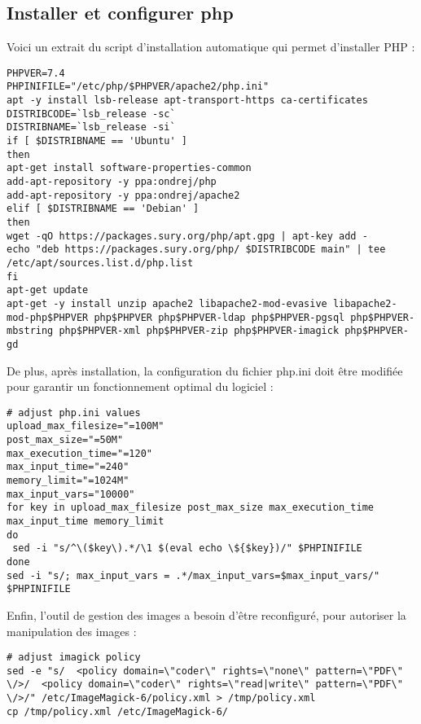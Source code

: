 \subsection{Installer et configurer php}
Voici un extrait du script d'installation automatique qui permet d'installer PHP :
\begin{lstlisting}
PHPVER=7.4
PHPINIFILE="/etc/php/$PHPVER/apache2/php.ini"
apt -y install lsb-release apt-transport-https ca-certificates
DISTRIBCODE=`lsb_release -sc`
DISTRIBNAME=`lsb_release -si`
if [ $DISTRIBNAME == 'Ubuntu' ]
then
apt-get install software-properties-common
add-apt-repository -y ppa:ondrej/php
add-apt-repository -y ppa:ondrej/apache2
elif [ $DISTRIBNAME == 'Debian' ]
then
wget -qO https://packages.sury.org/php/apt.gpg | apt-key add -
echo "deb https://packages.sury.org/php/ $DISTRIBCODE main" | tee /etc/apt/sources.list.d/php.list
fi
apt-get update
apt-get -y install unzip apache2 libapache2-mod-evasive libapache2-mod-php$PHPVER php$PHPVER php$PHPVER-ldap php$PHPVER-pgsql php$PHPVER-mbstring php$PHPVER-xml php$PHPVER-zip php$PHPVER-imagick php$PHPVER-gd
\end{lstlisting}

De plus, après installation, la configuration du fichier php.ini doit être modifiée pour garantir un fonctionnement optimal du logiciel :
\begin{lstlisting}
# adjust php.ini values
upload_max_filesize="=100M"
post_max_size="=50M"
max_execution_time="=120"
max_input_time="=240"
memory_limit="=1024M"
max_input_vars="10000"
for key in upload_max_filesize post_max_size max_execution_time max_input_time memory_limit
do
 sed -i "s/^\($key\).*/\1 $(eval echo \${$key})/" $PHPINIFILE
done
sed -i "s/; max_input_vars = .*/max_input_vars=$max_input_vars/" $PHPINIFILE
\end{lstlisting}

Enfin, l'outil de gestion des images a besoin d'être reconfiguré, pour autoriser la manipulation des images :
\begin{lstlisting}
# adjust imagick policy
sed -e "s/  <policy domain=\"coder\" rights=\"none\" pattern=\"PDF\" \/>/  <policy domain=\"coder\" rights=\"read|write\" pattern=\"PDF\" \/>/" /etc/ImageMagick-6/policy.xml > /tmp/policy.xml
cp /tmp/policy.xml /etc/ImageMagick-6/
\end{lstlisting}


